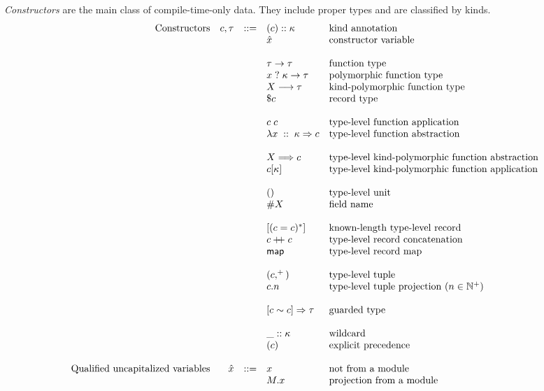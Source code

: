 \documentclass{article}
\newcommand{\mt}[1]{\mathsf{#1}}
\newcommand{\rc}{+ \hspace{-.075in} + \;}
\begin{document}
\emph{Constructors} are the main class of compile-time-only data.  They include proper types and are classified by kinds.
$$\begin{array}{rrcll}
  \textrm{Constructors} & c, \tau &::=& (c) :: \kappa & \textrm{kind annotation} \\
  &&& \hat{x} & \textrm{constructor variable} \\
  \\
  &&& \tau \to \tau & \textrm{function type} \\
  &&& x \; ? \; \kappa \to \tau & \textrm{polymorphic function type} \\
  &&& X \longrightarrow \tau & \textrm{kind-polymorphic function type} \\
  &&& \$ c & \textrm{record type} \\
  \\
  &&& c \; c & \textrm{type-level function application} \\
  &&& \lambda x \; :: \; \kappa \Rightarrow c & \textrm{type-level function abstraction} \\
  \\
  &&& X \Longrightarrow c & \textrm{type-level kind-polymorphic function abstraction} \\
  &&& c [\kappa] & \textrm{type-level kind-polymorphic function application} \\
  \\
  &&& () & \textrm{type-level unit} \\
  &&& \#X & \textrm{field name} \\
  \\
  &&& [(c = c)^*] & \textrm{known-length type-level record} \\
  &&& c \rc c & \textrm{type-level record concatenation} \\
  &&& \mt{map} & \textrm{type-level record map} \\
  \\
  &&& (c,^+) & \textrm{type-level tuple} \\
  &&& c.n & \textrm{type-level tuple projection ($n \in \mathbb N^+$)} \\
  \\
  &&& [c \sim c] \Rightarrow \tau & \textrm{guarded type} \\
  \\
  &&& \_ :: \kappa & \textrm{wildcard} \\
  &&& (c) & \textrm{explicit precedence} \\
  \\
  \textrm{Qualified uncapitalized variables} & \hat{x} &::=& x & \textrm{not from a module} \\
  &&& M.x & \textrm{projection from a module} \\
\end{array}$$
\end{document}
